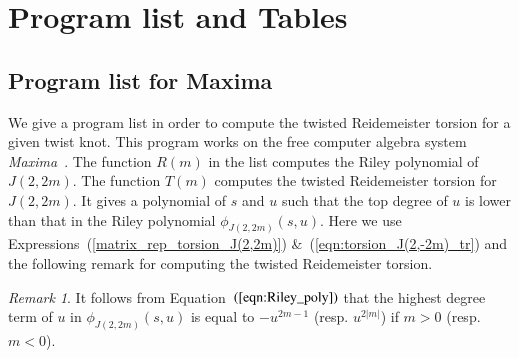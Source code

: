 \documentclass[a4paper]{amsart}
\theoremstyle{plain}
\theoremstyle{definition}
\theoremstyle{remark}
\newtheorem{remark}{Remark}%
\begin{document}
\clearpage
\appendix
\section{Program list and Tables}

\subsection{Program list for Maxima}
We give a program list 
in order to compute the twisted Reidemeister torsion 
for a given twist knot.
This program works on the free computer algebra system \emph{Maxima}~\cite{Max}.
The function $R(m)$ in the list computes the Riley polynomial of $J(2, 2m)$.
The function $T(m)$ computes  the twisted Reidemeister torsion for $J(2, 2m)$.
It gives a polynomial of $s$ and $u$ such that the top degree of $u$ is lower
than that in the Riley polynomial $\phi_{J(2, 2m)}(s, u)$.
Here we use Expressions~(\ref{matrix_rep_torsion_J(2,2m)}) \&~(\ref{eqn:torsion_J(2,-2m)_tr}) and the following remark
for computing the twisted Reidemeister torsion.
\begin{remark}
It follows from Equation~$(\ref{eqn:Riley_poly})$ that
the highest degree term of $u$ in $\phi_{J(2,2m)}(s, u)$ is equal to 
 $-u^{2m-1}$ (resp. $u^{2|m|}$) if $m>0$ (resp. $m<0$).
\end{remark}
\end{document}
